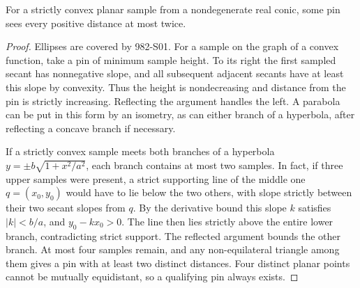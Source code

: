 \begin{theorem}[982-S02]
For a strictly convex planar sample from a nondegenerate real conic, some pin sees every positive distance at most twice.
\end{theorem}

\begin{proof}
Ellipses are covered by 982-S01. For a sample on the graph of a convex function, take a pin of minimum sample height. To its right the first sampled secant has nonnegative slope, and all subsequent adjacent secants have at least this slope by convexity. Thus the height is nondecreasing and distance from the pin is strictly increasing. Reflecting the argument handles the left. A parabola can be put in this form by an isometry, as can either branch of a hyperbola, after reflecting a concave branch if necessary.

If a strictly convex sample meets both branches of a hyperbola \(y=\pm b\sqrt{1+x^2/a^2}\), each branch contains at most two samples. In fact, if three upper samples were present, a strict supporting line of the middle one \(q=(x_0,y_0)\) would have to lie below the two others, with slope strictly between their two secant slopes from \(q\). By the derivative bound this slope \(k\) satisfies \(|k|<b/a\), and \(y_0-kx_0>0\). The line then lies strictly above the entire lower branch, contradicting strict support. The reflected argument bounds the other branch. At most four samples remain, and any non-equilateral triangle among them gives a pin with at least two distinct distances. Four distinct planar points cannot be mutually equidistant, so a qualifying pin always exists.
\end{proof}

